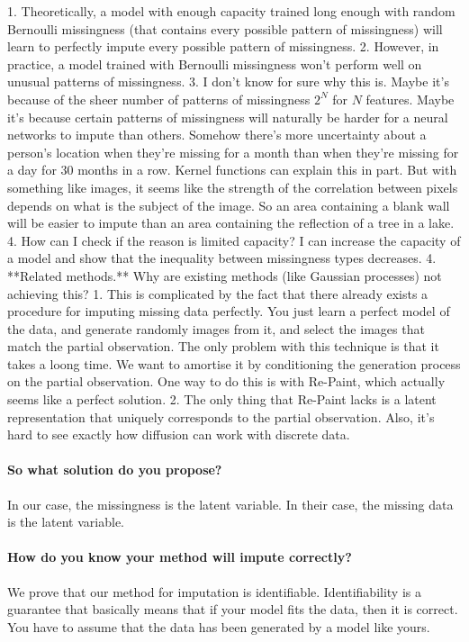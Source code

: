 \documentclass[a4paper,12pt,twoside,openright]{article}
\begin{document}
      1. Theoretically, a model with enough capacity trained long enough with random Bernoulli missingness (that contains every possible pattern of missingness) will learn to perfectly impute every possible pattern of missingness. 
      2. However, in practice, a model trained with Bernoulli missingness won't perform well on unusual patterns of missingness. 
      3. I don't know for sure why this is. Maybe it's because of the sheer number of patterns of missingness $2^N$ for $N$ features. Maybe it's because certain patterns of missingness will naturally be harder for a neural networks to impute than others. Somehow there's more uncertainty about a person's location when they're missing for a month than when they're missing for a day for 30 months in a row. Kernel functions can explain this in part. But with something like images, it seems like the strength of the correlation between pixels depends on what is the subject of the image. So an area containing a blank wall will be easier to impute than an area containing the reflection of a tree in a lake.
      4. How can I check if the reason is limited capacity? I can increase the capacity of a model and show that the inequality between missingness types decreases.
   4. **Related methods.** Why are existing methods (like Gaussian processes) not achieving this?
      1. This is complicated by the fact that there already exists a procedure for imputing missing data perfectly. You just learn a perfect model of the data, and generate randomly images from it, and select the images that match the partial observation. The only problem with this technique is that it takes a loong time. We want to amortise it by conditioning the generation process on the partial observation. One way to do this is with Re-Paint, which actually seems like a perfect solution. 
      2. The only thing that Re-Paint lacks is a latent representation that uniquely corresponds to the partial observation. Also, it's hard to see exactly how diffusion can work with discrete data.

\paragraph{So what solution do you propose?} In our case, the missingness is the latent variable. In their case, the missing data is the latent variable.

\paragraph{How do you know your method will impute correctly?} We prove that our method for imputation is identifiable. Identifiability is a guarantee that basically means that if your model fits the data, then it is correct. You have to assume that the data has been generated by a model like yours.
\end{document}
